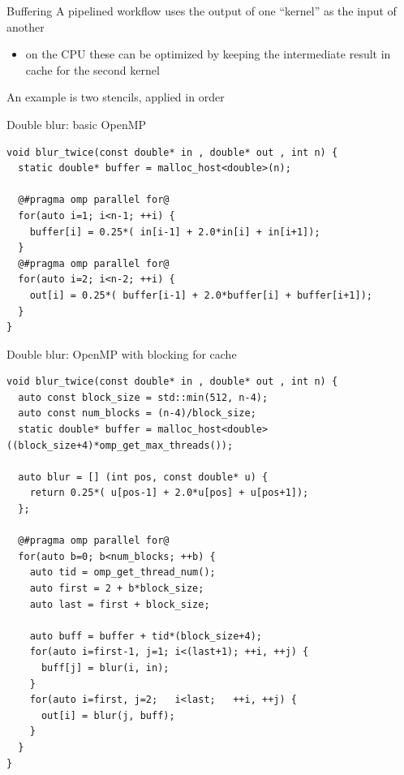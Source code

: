 \begin{frame}[fragile]{}
    \begin{info}{Buffering}
        A pipelined workflow uses the output of one ``kernel'' as the input of another
        \begin{itemize}
            \item on the CPU these can be optimized by keeping the intermediate result in cache for the second kernel
        \end{itemize}
        An example is two stencils, applied in order
    \end{info}

    \begin{code}{Double blur: basic OpenMP}
        \begin{lstlisting}[style=boxcudatiny]
void blur_twice(const double* in , double* out , int n) {
  static double* buffer = malloc_host<double>(n);

  @#pragma omp parallel for@
  for(auto i=1; i<n-1; ++i) {
    buffer[i] = 0.25*( in[i-1] + 2.0*in[i] + in[i+1]);
  }
  @#pragma omp parallel for@
  for(auto i=2; i<n-2; ++i) {
    out[i] = 0.25*( buffer[i-1] + 2.0*buffer[i] + buffer[i+1]);
  }
}
        \end{lstlisting}
    \end{code}

\end{frame}

\begin{frame}[fragile]{}
    \begin{code}{Double blur: OpenMP with blocking for cache}
        \begin{lstlisting}[style=boxcudatiny]
void blur_twice(const double* in , double* out , int n) {
  auto const block_size = std::min(512, n-4);
  auto const num_blocks = (n-4)/block_size;
  static double* buffer = malloc_host<double>((block_size+4)*omp_get_max_threads());

  auto blur = [] (int pos, const double* u) {
    return 0.25*( u[pos-1] + 2.0*u[pos] + u[pos+1]);
  };

  @#pragma omp parallel for@
  for(auto b=0; b<num_blocks; ++b) {
    auto tid = omp_get_thread_num();
    auto first = 2 + b*block_size;
    auto last = first + block_size;

    auto buff = buffer + tid*(block_size+4);
    for(auto i=first-1, j=1; i<(last+1); ++i, ++j) {
      buff[j] = blur(i, in);
    }
    for(auto i=first, j=2;   i<last;   ++i, ++j) {
      out[i] = blur(j, buff);
    }
  }
}
        \end{lstlisting}
    \end{code}
\end{frame}

